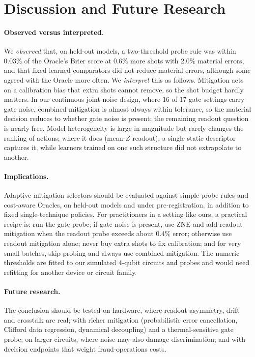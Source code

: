 \documentclass[11pt]{article}
\begin{document}
\section{Discussion and Future Research}
\label{sec:discussion}

\paragraph{Observed versus interpreted.}
We \emph{observed} that, on held-out models, a two-threshold probe rule was within 0.03\% of the Oracle's Brier score at 0.6\% more shots with 2.0\% material errors, and that fixed learned comparators did not reduce material errors, although some agreed with the Oracle more often.
We \emph{interpret} this as follows.
Mitigation acts on a calibration bias that extra shots cannot remove, so the shot budget hardly matters.
In our continuous joint-noise design, where 16 of 17 gate settings carry gate noise, combined mitigation is almost always within tolerance, so the material decision reduces to whether gate noise is present; the remaining readout question is nearly free.
Model heterogeneity is large in magnitude but rarely changes the ranking of actions; where it does (mean-$Z$ readout), a single static descriptor captures it, while learners trained on one such structure did not extrapolate to another.

\paragraph{Implications.}
Adaptive mitigation selectors should be evaluated against simple probe rules and cost-aware Oracles, on held-out models and under pre-registration, in addition to fixed single-technique policies.
For practitioners in a setting like ours, a practical recipe is: run the gate probe; if gate noise is present, use ZNE and add readout mitigation when the readout probe exceeds about 0.4\% error; otherwise use readout mitigation alone; never buy extra shots to fix calibration; and for very small batches, skip probing and always use combined mitigation.
The numeric thresholds are fitted to our simulated 4-qubit circuits and probes and would need refitting for another device or circuit family.

\paragraph{Future research.}
The conclusion should be tested on hardware, where readout asymmetry, drift and crosstalk are real; with richer mitigation (probabilistic error cancellation, Clifford data regression, dynamical decoupling) and a thermal-sensitive gate probe; on larger circuits, where noise may also damage discrimination; and with decision endpoints that weight fraud-operations costs.
\end{document}
